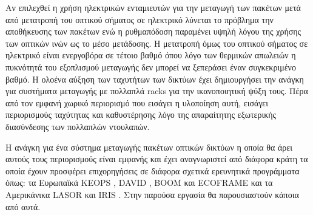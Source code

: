 Αν επιλεχθεί η χρήση ηλεκτρικών ενταμιευτών για την μεταγωγή των
πακέτων μετά από μετατροπή του οπτικού σήματος σε ηλεκτρικό λύνεται το
πρόβλημα την αποθήκευσης των πακέτων ενώ η ρυθμαπόδοση παραμένει υψηλή
λόγου της χρήσης των οπτικών ινών ως το μέσο μετάδοσης. Η μετατροπή
όμως του οπτικού σήματος σε ηλεκτρικό είναι ενεργοβόρα σε τέτοιο βαθμό
όπου λόγο των θερμικών απωλειών η πυκνότητά του εξοπλισμού μεταγωγής
δεν μπορεί να ξεπεράσει έναν συγκεκριμένο βαθμό. Η ολοένα αύξηση των
ταχυτήτων των δικτύων έχει δημιουργήσει την ανάγκη για συστήματα
μεταγωγής με πολλαπλά racks για την ικανοποιητική ψύξη τους. Πέρα
από τον εμφανή χωρικό περιορισμό που εισάγει η υλοποίηση αυτή, εισάγει
περιορισμούς ταχύτητας και καθυστέρησης λόγο της απαραίτητης
εξωτερικής διασύνδεσης των πολλαπλών ντουλαπών.

Η ανάγκη για ένα σύστημα μεταγωγής πακέτων οπτικών δικτύων η οποία θα
άρει αυτούς τους περιορισμούς είναι εμφανής και έχει αναγνωριστεί από
διάφορα κράτη τα οποία έχουν προσφέρει επιχορηγήσεις σε διάφορα
σχετικά ερευνητικά προγράμματα όπως: τα Ευρωπαϊκά KEOPS \cite{736580},
DAVID \cite{1230193}, BOOM \cite{5398841} και ECOFRAME \cite{5465485}
και τα Αμερικάνικα LASOR \cite{4804163} και IRIS \cite{IRIS}. Στην
παρούσα εργασία θα παρουσιαστούν κάποια από αυτά.

